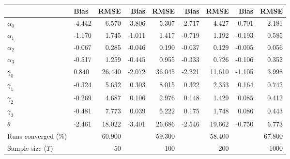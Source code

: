 
\begin{tabular}[t]{llrrrrrrr}
\toprule
  & Bias & RMSE & Bias & RMSE & Bias & RMSE & Bias & RMSE\\
\midrule
$\alpha_{0}$ & -4.442 & 6.570 & -3.806 & 5.307 & -2.717 & 4.427 & -0.701 & 2.181\\
$\alpha_{1}$ & -1.170 & 1.745 & -1.011 & 1.417 & -0.719 & 1.192 & -0.193 & 0.585\\
$\alpha_{2}$ & -0.067 & 0.285 & -0.046 & 0.190 & -0.037 & 0.129 & -0.005 & 0.056\\
$\alpha_{3}$ & -0.517 & 1.259 & -0.445 & 0.955 & -0.333 & 0.726 & -0.106 & 0.352\\
$\gamma_{0}$ & 0.840 & 26.440 & -2.072 & 36.045 & -2.221 & 11.610 & -1.105 & 3.998\\
$\gamma_{1}$ & -0.324 & 5.632 & 0.303 & 8.015 & 0.322 & 2.353 & 0.164 & 0.742\\
$\gamma_{2}$ & -0.269 & 4.687 & 0.106 & 2.976 & 0.148 & 1.429 & 0.085 & 0.412\\
$\gamma_{3}$ & -0.481 & 7.773 & 0.039 & 5.222 & 0.175 & 1.748 & 0.086 & 0.443\\
$\theta$ & -2.461 & 18.022 & -3.401 & 26.686 & -2.546 & 19.662 & -0.750 & 6.773\\
Runs converged (\%) &  & 60.900 &  & 59.300 &  & 58.400 &  & 67.800\\
Sample size ($T$) &  & 50 &  & 100 &  & 200 &  & 1000\\
\bottomrule
\end{tabular}
